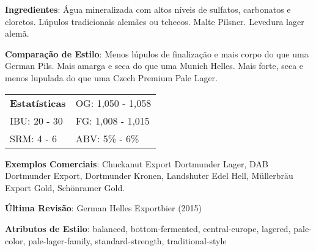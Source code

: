 \textbf{Ingredientes}: Água mineralizada com altos níveis de sulfatos, carbonatos e cloretos. Lúpulos tradicionais alemães ou tchecos. Malte Pilsner. Levedura lager alemã.

\textbf{Comparação de Estilo}: Menos lúpulos de finalização e mais corpo do que uma German Pils. Mais amarga e seca do que uma Munich Helles. Mais forte, seca e menos lupulada do que uma Czech Premium Pale Lager.

\begin{tabular}{@{}p{35mm}p{35mm}@{}}
  \textbf{Estatísticas} & OG: 1,050 - 1,058 \\
  IBU: 20 - 30  & FG: 1,008 - 1,015  \\
  SRM: 4 - 6  & ABV: 5\% - 6\%
\end{tabular}

\textbf{Exemplos Comerciais}: Chuckanut Export Dortmunder Lager, DAB Dortmunder Export, Dortmunder Kronen, Landshuter Edel Hell, Müllerbräu Export Gold, Schönramer Gold.

\textbf{Última Revisão}: German Helles Exportbier (2015)

\textbf{Atributos de Estilo}: balanced, bottom-fermented, central-europe, lagered, pale-color, pale-lager-family, standard-strength, traditional-style
